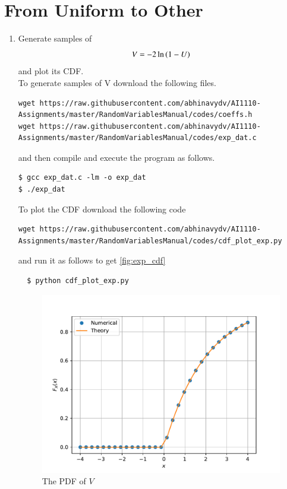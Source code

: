 \documentclass[journal,12pt,twocolumn]{IEEEtran}
\renewcommand\thesection{\arabic{section}}
\begin{document}
\begin{enumerate}[label=\thesection.\arabic*
        ,ref=\thesection.\theenumi]
\end{enumerate}
\section{From Uniform to Other}
\begin{enumerate}[label=\thesection.\arabic*
        ,ref=\thesection.\theenumi]
    \item
          Generate samples of
          \begin{equation}
              V = -2\ln\left(1-U\right)
          \end{equation}
          and plot its CDF.\\
          \solution To generate samples of V download the following files.
          \begin{lstlisting}
wget https://raw.githubusercontent.com/abhinavydv/AI1110-Assignments/master/RandomVariablesManual/codes/coeffs.h
wget https://raw.githubusercontent.com/abhinavydv/AI1110-Assignments/master/RandomVariablesManual/codes/exp_dat.c
        \end{lstlisting}

          and then compile and execute the program as follows.
          \begin{lstlisting}
$ gcc exp_dat.c -lm -o exp_dat
$ ./exp_dat
        \end{lstlisting}

          To plot the CDF download the following code
          \begin{lstlisting}
wget https://raw.githubusercontent.com/abhinavydv/AI1110-Assignments/master/RandomVariablesManual/codes/cdf_plot_exp.py
\end{lstlisting}
          and run it as follows to get \autoref{fig:exp_cdf}
          \begin{lstlisting}
  $ python cdf_plot_exp.py
\end{lstlisting}

          \begin{figure}
              \centering
              \includegraphics[width=\columnwidth]{./figs/exp_cdf}
              \caption{The PDF of $V$}
              \label{fig:exp_cdf}
          \end{figure}


\end{enumerate}
\end{document}
